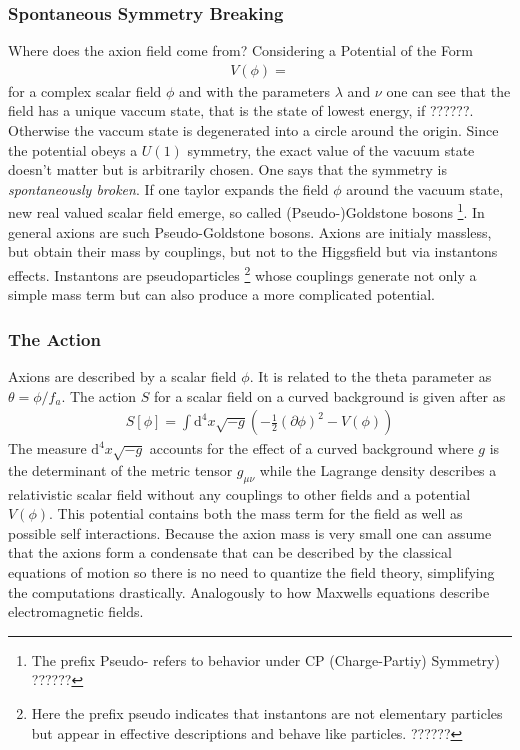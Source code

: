 \documentclass[a4paper, 12pt]{article}
\newcommand{\diff}{\mathrm{d}}
\begin{document}
\subsubsection{Spontaneous Symmetry Breaking}
Where does the axion field come from?
Considering a Potential of the Form
\begin{align}
    V(\phi) =
\end{align}
for a complex scalar field $\phi$ and with the parameters $\lambda$ and $\nu$
one can see that the field has a unique vaccum state, that is the state of lowest energy, if ??????.
Otherwise the vaccum state is degenerated into a circle around the origin.
Since the potential obeys a $U(1)$ symmetry, the exact value of the vacuum state doesn't matter but is arbitrarily
chosen. One says that the symmetry is \emph{spontaneously broken}. If one taylor expands the field $\phi$ around the
vacuum state, new real valued scalar field emerge, so called (Pseudo-)Goldstone bosons \footnote{The prefix Pseudo-
refers to behavior under CP (Charge-Partiy) Symmetry) ??????}.
In general axions are such Pseudo-Goldstone bosons. Axions are initialy massless, but obtain their mass by couplings, but
not to the Higgsfield but via instantons effects. Instantons are pseudoparticles \footnote{Here the prefix pseudo
indicates that instantons are not elementary particles but appear in effective descriptions and behave like particles. ??????}
whose couplings generate not only a simple mass term but can also produce a more complicated potential.

\subsubsection{The Action}
Axions are described by a scalar field $\phi$. It is related to the theta parameter as $\theta = \phi / f_a$.
The action $S$ for a scalar field on a curved background is given after \cite[Chap. 4.1, Page 25]{MarshAxionCosmo}
 as
\begin{align}
    \label{eq:action}
    S[\phi] = \int \diff^4 x \sqrt{-g} \left(- \frac{1}{2} (\partial \phi)^2 - V(\phi) \right)
\end{align}
The measure $\diff^4 x \sqrt{-g}$ accounts for the effect of a curved background where $g$ is the determinant of the metric tensor $g_{\mu \nu}$ while
the Lagrange density describes a relativistic scalar field without any couplings to other fields
and a potential $V(\phi)$.
This potential contains both the mass term for the field
as well as  possible self interactions.
Because the axion mass is very small one
can assume that the axions form a condensate
that can be described by the classical equations
of motion so there is no need to quantize the
field theory, simplifying the computations
drastically. Analogously to how Maxwells
equations describe electromagnetic fields.
\end{document}
